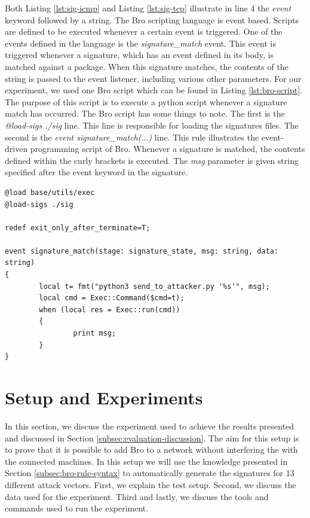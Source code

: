 Both Listing \ref{lst:sig-icmp} and Listing \ref{lst:sig-tcp} illustrate in line 4 the \emph{event} keyword followed by a string. The Bro scripting language is event based. Scripts are defined to be executed whenever a certain event is triggered. One of the events defined in the language is the \emph{signature\_match} event. This event is triggered whenever a signature, which has an event defined in its body, is matched against a package. When this signature matches, the contents of the string is passed to the event listener, including various other parameters. For our experiment, we used one Bro script which can be found in Listing \ref{lst:bro-script}. The purpose of this script is to execute a python script whenever a signature match has occurred. The Bro script has some things to note. The first is the \emph{@load-sigs ./sig} line. This line is responsible for loading the signatures files. The second is the \emph{event signature\_match($\dots$)} line. This rule illustrates the event-driven programming script of Bro. Whenever a signature is matched, the contents defined within the curly brackets is executed. The \emph{msg} parameter is given string specified after the event keyword in the signature.  

  
\begin{lstlisting}[caption={Bro script which executes whenever signature match occurs}, label={lst:bro-script}, float=tp, floatplacement=tbp,]
@load base/utils/exec
@load-sigs ./sig

redef exit_only_after_terminate=T;

event signature_match(stage: signature_state, msg: string, data: string)
{
        local t= fmt("python3 send_to_attacker.py '%s'", msg);
        local cmd = Exec::Command($cmd=t);
        when (local res = Exec::run(cmd))
        {
                print msg;
        }
}
\end{lstlisting} 





\section{Setup and Experiments}\label{subsec:methodology}
In this section, we discuss the experiment used to achieve the results presented and discussed in Section \ref{subsec:evaluation-discussion}. The aim for this setup is to prove that it is possible to add Bro to a network without interfering the with the connected machines. In this setup we will use the knowledge presented in Section \ref{subsec:bro-rule-syntax} to automatically generate the signatures for 13 different attack vectors. First, we explain the test setup. Second, we discuss the data used for the experiment. Third and lastly, we discuss the tools and commands used to run the experiment. 

